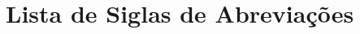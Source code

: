 
\chapter*{Lista de Siglas de Abreviações}
\cleardoublepage
{}
{}
\listoffigures

\thispagestyle{empty}